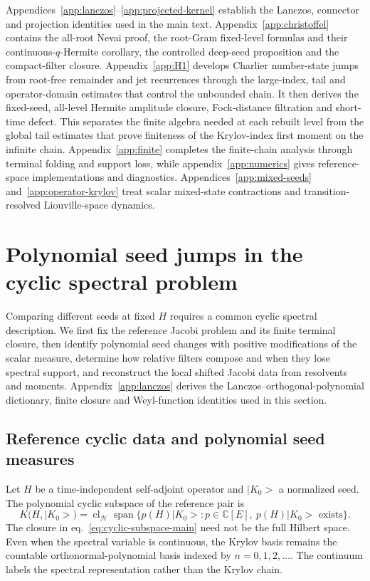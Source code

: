 \documentclass[a4paper,11pt]{article}
\def\ket#1{|#1>}%
\def\cK{K}%
\theoremstyle{definition}
\theoremstyle{remark}
\newcommand{\ket}[1]{|#1\rangle}
\newcommand{\CC}{\mathbb C}
\newcommand{\cK}{\mathcal K}
\newcommand{\Span}{\operatorname{span}}
\begin{document}
Appendices~\ref{app:lanczos}--\ref{app:projected-kernel} establish the Lanczos, connector and
projection identities used in the main text.  Appendix~\ref{app:christoffel} contains the
all-root Nevai proof, the root-Gram fixed-level formulas and their continuous-$q$-Hermite
corollary, the controlled deep-seed proposition and the compact-filter closure.
Appendix~\ref{app:H1} develops Charlier number-state jumps from root-free remainder and jet
recurrences through the large-index, tail and operator-domain estimates that control the
unbounded chain.  It then derives the fixed-seed, all-level Hermite amplitude closure, Fock-distance filtration
and short-time defect.  This separates the finite algebra needed at each rebuilt level from the
global tail estimates that prove finiteness of the Krylov-index first moment on the infinite chain.
Appendix~\ref{app:finite} completes the finite-chain analysis through terminal folding and
support loss, while appendix~\ref{app:numerics} gives reference-space implementations and diagnostics.
Appendices~\ref{app:mixed-seeds} and~\ref{app:operator-krylov} treat scalar mixed-state
contractions and transition-resolved Liouville-space dynamics.

\section{Polynomial seed jumps in the cyclic spectral problem}
\label{sec:setup}

Comparing different seeds at fixed $H$ requires a common cyclic spectral description. We first fix the reference Jacobi problem and its finite terminal closure, then identify polynomial seed changes with positive modifications of the scalar measure, determine how relative filters compose and when they lose spectral support, and reconstruct the local shifted Jacobi data from resolvents and moments. Appendix~\ref{app:lanczos} derives the Lanczos--orthogonal-polynomial dictionary, finite closure and Weyl-function identities used in this section.

\subsection{Reference cyclic data and polynomial seed measures}
\label{subsec:reference-seed-measures}
Let $H$ be a time-independent self-adjoint operator and $\ket{K_0}$ a normalized seed. The polynomial cyclic subspace of the reference pair is
\begin{equation}
   \cK(H,\ket{K_0})
   =
   \operatorname{cl}_{\mathcal H}
   \Span\{p(H)\ket{K_0}:p\in\CC[E],\ p(H)\ket{K_0}\text{ exists}\}.
   \label{eq:cyclic-subspace-main}
\end{equation}
The closure in eq.~\eqref{eq:cyclic-subspace-main} need not be the full Hilbert space. Even when the spectral variable is continuous, the Krylov basis remains the countable orthonormal-polynomial basis indexed by $n=0,1,2,\ldots$. The continuum labels the spectral representation rather than the Krylov chain.
\end{document}
